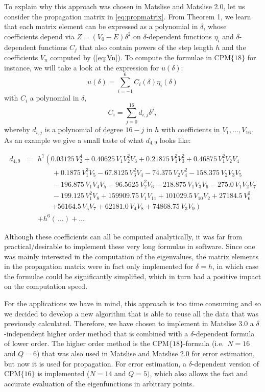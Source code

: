 To explain why this approach was chosen in Matslise and Matslise 2.0, let us consider the propagation matrix in \eqref{eq:propmatrix}. From Theorem 1, we learn that each matrix element can be expressed as a polynomial in $\delta$, whose coefficients depend
via $Z=(V_0-E) \delta^2$ on $\delta$-dependent functions $\eta_i$ and $\delta$-dependent functions $C_j$ that also contain powers of the step length $h$ and the coefficients $V_n$ computed by (\ref{eq:Vn}). To compute the formulae in $\text{CPM}\{18\}$ for instance, we will take a look at the expression for $u(\delta)$:
$$
  u(\delta) = \sum_{i = -1}^6 C_i(\delta) \eta_{i}(\delta)
$$
with $C_i$ a polynomial in $\delta$,
$$
  C_i  = \sum_{j=0}^{16} d_{i, j} \delta^j,
$$
whereby $d_{i, j}$ is a polynomial of degree $16-j$ in $h$ with coefficients in $V_1, \dots, V_{16}$. As an example we give a small taste of what $d_{4, 9}$ looks like:

\begin{eqnarray*}
  d_{4, 9}& =&  h^7 \left (0.03125 \, V_{2}^{4} + 0.40625 \, V_{1} V_{2}^{2} V_{3} + 0.21875 \, V_{1}^{2} V_{3}^{2} + 0.46875 \, V_{1}^{2} V_{2} V_{4} \right. \\
  &  & \qquad + 0.1875 \, V_{1}^{3} V_{5} - 67.8125 \, V_{3}^{2} V_{4} - 74.375 \, V_{2} V_{4}^{2} - 158.375 \, V_{2} V_{3} V_{5}         \\
  &  & \qquad - 196.875 \, V_{1} V_{4} V_{5} - 96.5625 \, V_{2}^{2} V_{6} - 218.875 \, V_{1} V_{3} V_{6} - 275.0 \, V_{1} V_{2} V_{7}     \\
  &  & \qquad - 199.125 \, V_{1}^{2} V_{8} + 159909.75 \, V_{1} V_{11} + 101029.5 \, V_{10} V_{2} + 27184.5 \, V_{6}^{2}                  \\
  &  & \qquad \left.+ 56164.5 \, V_{5} V_{7} + 62181.0 \, V_{4} V_{8} + 74868.75 \, V_{3} V_{9} \right)                                                 \\
  &  & + h^6 (\,\dots)  + \dots
\end{eqnarray*}


Although these coefficients can all be computed analytically, it was far from practical/desirable to implement these very long formulae in software. Since one was mainly interested in the computation of
the eigenvalues, the matrix elements in the propagation matrix were in fact only implemented for $\delta=h$, in which case the formulae could be significantly simplified, which in turn had a positive impact on the computation speed.

For the applications we have in mind, this approach is too time consuming and so we decided to develop a new algorithm that is able to reuse all the data that was previously calculated.
Therefore, we have chosen to implement in Matslise 3.0 a $\delta$-independent higher order method that is combined with a $\delta$-dependent formula of lower order.
The higher order method is the $\text{CPM}\{18\}$-formula (i.e.\ $N=16$ and $Q=6$) %
that was also used in Matslise and Matslise 2.0 for error estimation, but now it is used for propagation.
For error estimation, a $\delta$-dependent version of $\text{CPM}\{16\}$ is implemented ($N=14$ and $Q=5)$, which also allows the fast and accurate evaluation of the eigenfunctions in arbitrary points.


